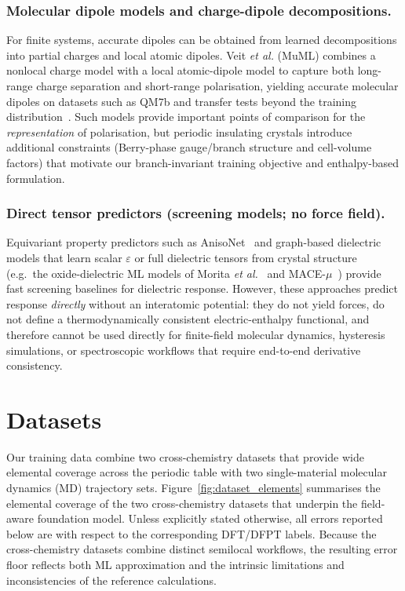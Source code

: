 \documentclass[aps,physrev,graphicx,amsmath,amssymb,
               reprint,superscriptaddress]{revtex4-2}
\begin{document}
\subsubsection*{Molecular dipole models and charge-dipole decompositions.}
For finite systems, accurate dipoles can be obtained from learned decompositions into partial charges and local atomic dipoles. Veit \emph{et al.} (MuML) combines a nonlocal charge model with a local atomic-dipole model to capture both long-range charge separation and short-range polarisation, yielding accurate molecular dipoles on datasets such as QM7b and transfer tests beyond the training distribution~\cite{Veit2020MuMLDipoles}. Such models provide important points of comparison for the \emph{representation} of polarisation, but periodic insulating crystals introduce additional constraints (Berry-phase gauge/branch structure and cell-volume factors) that motivate our branch-invariant training objective and enthalpy-based formulation.

\subsubsection*{Direct tensor predictors (screening models; no force field).}
Equivariant property predictors such as AnisoNet~\cite{anisonet-2024} and graph-based dielectric models that learn scalar $\varepsilon$ or full dielectric tensors from crystal structure (e.g.\ the oxide-dielectric ML models of Morita \emph{et al.}~\cite{Morita2020} and MACE-$\mu$~\cite{Kapil2024FaradayDiscuss}) provide fast screening baselines for dielectric response. However, these approaches predict response \emph{directly} without an interatomic potential: they do not yield forces, do not define a thermodynamically consistent electric-enthalpy functional, and therefore cannot be used directly for finite-field molecular dynamics, hysteresis simulations, or spectroscopic workflows that require end-to-end derivative consistency.

\section{Datasets}\label{sec:datasets}

Our training data combine two cross-chemistry datasets that provide wide elemental coverage across the periodic table with two single-material molecular dynamics (MD) trajectory sets. Figure~\ref{fig:dataset_elements} summarises the elemental coverage of the two cross-chemistry datasets that underpin the field-aware foundation model. Unless explicitly stated otherwise, all errors reported below are with respect to the corresponding DFT/DFPT labels. Because the cross-chemistry datasets combine distinct semilocal workflows, the resulting error floor reflects both ML approximation and the intrinsic limitations and inconsistencies of the reference calculations.
\end{document}
